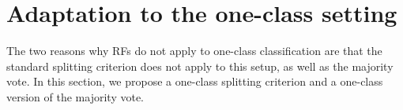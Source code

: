 


\section{Adaptation to the one-class setting}
\label{ocrf:sec:one-class}
The two reasons why \acp{RF} do not apply to one-class classification are that
the standard splitting criterion does not apply to this setup, as well as the
majority vote. In this section, we propose a one-class splitting criterion and
a one-class version of the majority vote.
